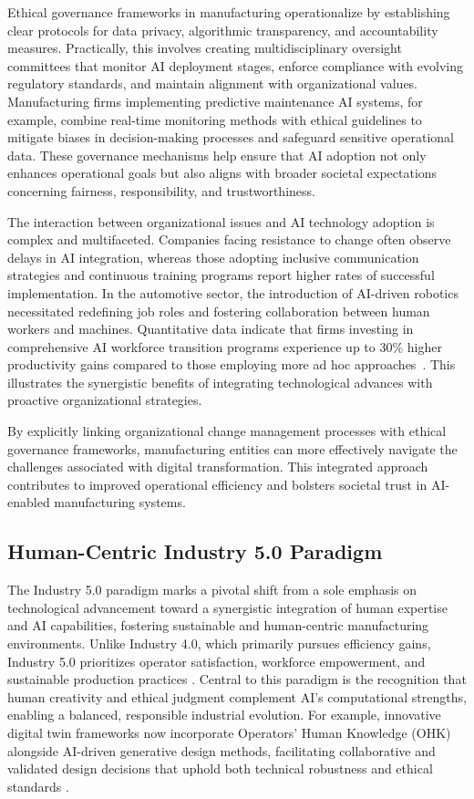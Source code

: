 \documentclass[sigconf]{acmart}
\begin{document}
Ethical governance frameworks in manufacturing operationalize by establishing clear protocols for data privacy, algorithmic transparency, and accountability measures. Practically, this involves creating multidisciplinary oversight committees that monitor AI deployment stages, enforce compliance with evolving regulatory standards, and maintain alignment with organizational values. Manufacturing firms implementing predictive maintenance AI systems, for example, combine real-time monitoring methods with ethical guidelines to mitigate biases in decision-making processes and safeguard sensitive operational data. These governance mechanisms help ensure that AI adoption not only enhances operational goals but also aligns with broader societal expectations concerning fairness, responsibility, and trustworthiness.

The interaction between organizational issues and AI technology adoption is complex and multifaceted. Companies facing resistance to change often observe delays in AI integration, whereas those adopting inclusive communication strategies and continuous training programs report higher rates of successful implementation. In the automotive sector, the introduction of AI-driven robotics necessitated redefining job roles and fostering collaboration between human workers and machines. Quantitative data indicate that firms investing in comprehensive AI workforce transition programs experience up to 30\% higher productivity gains compared to those employing more ad hoc approaches~\cite{}. This illustrates the synergistic benefits of integrating technological advances with proactive organizational strategies.

By explicitly linking organizational change management processes with ethical governance frameworks, manufacturing entities can more effectively navigate the challenges associated with digital transformation. This integrated approach contributes to improved operational efficiency and bolsters societal trust in AI-enabled manufacturing systems.

\subsection{Human-Centric Industry 5.0 Paradigm}

The Industry 5.0 paradigm marks a pivotal shift from a sole emphasis on technological advancement toward a synergistic integration of human expertise and AI capabilities, fostering sustainable and human-centric manufacturing environments. Unlike Industry 4.0, which primarily pursues efficiency gains, Industry 5.0 prioritizes operator satisfaction, workforce empowerment, and sustainable production practices \cite{ref2}. Central to this paradigm is the recognition that human creativity and ethical judgment complement AI’s computational strengths, enabling a balanced, responsible industrial evolution. For example, innovative digital twin frameworks now incorporate Operators’ Human Knowledge (OHK) alongside AI-driven generative design methods, facilitating collaborative and validated design decisions that uphold both technical robustness and ethical standards \cite{ref14}.
\end{document}
